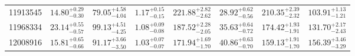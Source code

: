\documentclass[structabstract]{aa}
\begin{document}
\begin{table*}
\begin{tabular}{l r r c c c c c}
11913545         & $14.80_{-0.30}^{+0.29}$   &   $79.05_{-4.04}^{+4.58}$   &   $1.17_{-0.15}^{+0.15}$   &   $221.88_{-2.62}^{+2.82}$   &   $28.92_{-0.56}^{+0.62}$   &   $210.35_{-2.32}^{+2.39}$   &   $103.91_{-1.21}^{+1.13}$ \\[1pt]
11968334         & $23.14_{-0.57}^{+0.55}$   &   $99.13_{-4.25}^{+4.51}$   &   $1.08_{-0.08}^{+0.09}$   &   $187.52_{-2.05}^{+2.28}$   &   $35.63_{-0.72}^{+0.64}$   &   $174.42_{-1.91}^{+1.93}$   &   $131.70_{-2.43}^{+2.17}$ \\[1pt]
12008916         & $15.81_{-0.66}^{+0.65}$   &   $91.17_{-3.50}^{+3.66}$   &   $1.03_{-0.07}^{+0.07}$   &   $171.94_{-1.70}^{+1.69}$   &   $40.86_{-0.70}^{+0.63}$   &   $159.13_{-1.70}^{+1.91}$   &   $156.39_{-3.29}^{+3.46}$ \\[1pt]
\hline                                
\end{tabular}
\label{tab:bkg1}
\end{table*}
\end{document}
